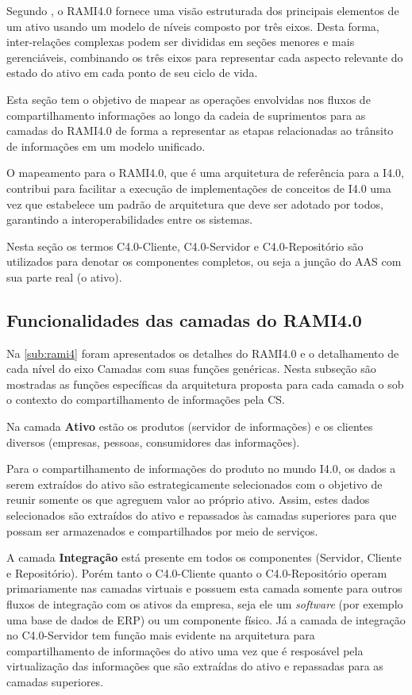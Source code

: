 Segundo , o RAMI4.0 fornece uma visão estruturada dos principais elementos de um ativo usando um modelo de níveis composto por três eixos. Desta forma, inter-relações complexas podem ser divididas em seções menores e mais gerenciáveis, combinando os três eixos para representar cada aspecto relevante do estado do ativo em cada ponto de seu ciclo de vida.

Esta seção tem o objetivo de mapear as operações envolvidas nos fluxos de compartilhamento informações ao longo da cadeia de suprimentos para as camadas do RAMI4.0 de forma a representar as etapas relacionadas ao trânsito de informações em um modelo unificado.

O mapeamento para o RAMI4.0, que é uma arquitetura de referência para a I4.0, contribui para facilitar a execução de implementações de conceitos de I4.0 uma vez que estabelece um padrão de arquitetura que deve ser adotado por todos, garantindo a interoperabilidades entre os sistemas.

Nesta seção os termos C4.0-Cliente, C4.0-Servidor e C4.0-Repositório são utilizados para denotar os componentes completos, ou seja a junção do AAS com sua parte real (o ativo).

\subsection{Funcionalidades das camadas do RAMI4.0}

Na \autoref{sub:rami4} foram apresentados os detalhes do RAMI4.0 e o detalhamento de cada nível do eixo Camadas com suas funções genéricas. Nesta subseção são mostradas as funções específicas da arquitetura proposta para cada camada o sob o contexto do compartilhamento de informações pela CS.

Na camada \textbf{Ativo} estão os produtos (servidor de informações) e os clientes diversos (empresas, pessoas, consumidores das informações).

Para o compartilhamento de informações do produto no mundo I4.0, os dados a serem extraídos do ativo são estrategicamente selecionados com o objetivo de reunir somente os que agreguem valor ao próprio ativo. Assim, estes dados selecionados são extraídos do ativo e repassados às camadas superiores para que possam ser armazenados e compartilhados por meio de serviços.

A camada \textbf{Integração} está presente em todos os componentes (Servidor, Cliente e Repositório). Porém tanto o C4.0-Cliente quanto o C4.0-Repositório operam primariamente nas camadas virtuais e possuem esta camada somente para outros fluxos de integração com os ativos da empresa, seja ele um \textit{software} (por exemplo uma base de dados de ERP) ou um componente físico. Já a camada de integração no C4.0-Servidor tem função mais evidente na arquitetura para compartilhamento de informações do ativo uma vez que é resposável pela virtualização das informações que são extraídas do ativo e repassadas para as camadas superiores.

